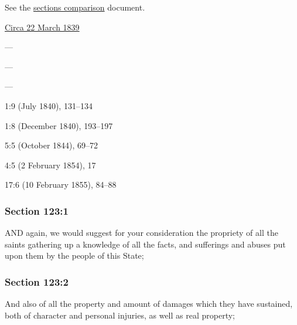		See the \href{https://drive.google.com/file/d/1goAvNz8jS4R8slYfMG_db55Ty2z_vmgK/view?usp=sharing}{sections comparison} document.
	
		\begin{compactdesc}
			\item[JSP] \hyperref[EMS-1839-JS-CIR-22-MAR-1839]{Circa 22 March 1839}
			\item[BC] ---
			\item[DC 1835] ---
			\item[DC 1844] ---
			\item[TS] 1:9 (July 1840), 131--134
			\item[MS] 1:8 (December 1840), 193--197
			\item[MS] 5:5 (October 1844), 69--72
			\item[DN] 4:5 (2 February 1854), 17
			\item[MS] 17:6 (10 February 1855), 84--88
		\end{compactdesc}

	\subsubsection{Section 123:1} %
		\label{DC123-1}

		AND again, we would suggest for your consideration the propriety of all the saints gathering up a knowledge of all the facts, and sufferings and abuses put upon them by the people of this State;


	\subsubsection{Section 123:2} %
		\label{DC123-2}

		And also of all the property and amount of damages which they have sustained, both of character and personal injuries, as well as real property;


